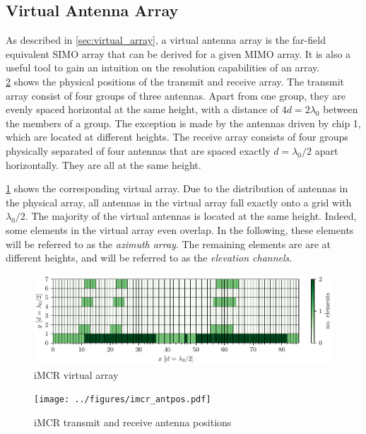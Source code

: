 \subsection{Virtual Antenna Array}

As described in \cref{sec:virtual_array},
a virtual antenna array is the far-field equivalent SIMO array that can be derived for a given MIMO array.
It is also a useful tool to gain an intuition on the resolution capabilities of an array.
\\

\cref{fig:imcr_antpos} shows the physical positions of the transmit and receive array.
The transmit array consist of four groups of three antennas.
Apart from one group, they are evenly spaced horizontal at the same height, with a distance of $4d=2\lambda_0$ between the members of a group.
The exception is made by the antennas driven by chip 1, which are located at different heights.
The receive array consists of four groups physically separated of four antennas that are spaced exactly $d=\lambda_0/2$ apart horizontally.
They are all at the same height.

\cref{fig:imcr_virt_array} shows the corresponding virtual array.
Due to the distribution of antennas in the physical array, all antennas in the virtual array fall exactly onto a grid with $\lambda_0/2$.
The majority of the virtual antennas is located at the same height.
Indeed, some elements in the virtual array even overlap.
In the following, these elements will be referred to as the \emph{azimuth array}.
The remaining elements are are at different heights,
and will be referred to as the \emph{elevation channels}.
\begin{figure}
    \centering
    \includegraphics[width=\textwidth]{../figures/virt_array.pdf}
    \caption{iMCR virtual array}
    \label{fig:imcr_virt_array}
\end{figure}

\begin{figure}
    \centering
    \texttt{[image: ../figures/imcr\_antpos.pdf]}
    \caption{iMCR transmit and receive antenna positions}
    \label{fig:imcr_antpos}
\end{figure}

